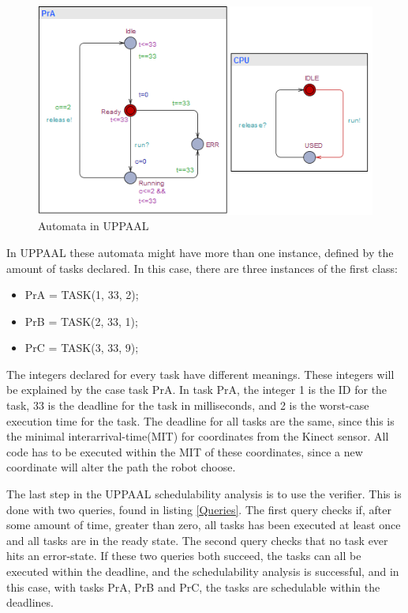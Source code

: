 \begin{figure}[h]
	\centering
	\includegraphics[scale=1]{billeder/UPPAALPr}
	\caption{Automata in UPPAAL}
	\label{UPPAAL Automata}
\end{figure}


In UPPAAL these automata might have more than one instance, defined by the amount of tasks declared. In this case, there are three instances of the first class:


\begin{itemize}
	\item PrA = TASK(1, 33, 2);
	\item PrB = TASK(2, 33, 1);
	\item PrC = TASK(3, 33, 9);
\end{itemize}


The integers declared for every task have different meanings. These integers will be explained by the case task PrA. In task PrA, the integer 1 is the ID for the task, 33 is the deadline for the task in milliseconds, and 2 is the worst-case execution time for the task. The deadline for all tasks are the same, since this is the minimal interarrival-time(MIT) for coordinates from the Kinect sensor. All code has to be executed within the MIT of these coordinates, since a new coordinate will alter the path the robot choose. 


The last step in the UPPAAL schedulability analysis is to use the verifier. This is done with two queries, found in listing \ref{Queries}. The first query checks if, after some amount of time, greater than zero, all tasks has been executed at least once and all tasks are in the ready state. The second query checks that no task ever hits an error-state. If these two queries both succeed, the tasks can all be executed within the deadline, and the schedulability analysis is successful, and in this case, with tasks PrA, PrB and PrC, the tasks are schedulable within the deadlines.


